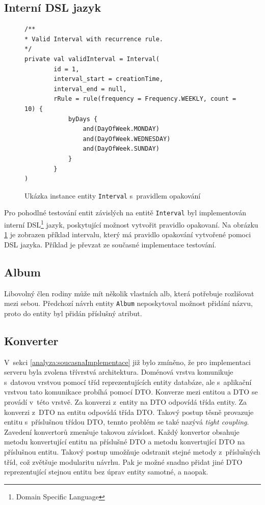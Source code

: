     \subsection{Interní DSL jazyk}\label{navrh:zmeny:dsl}
        \begin{figure} %
            \begin{verbatim}
/**
* Valid Interval with recurrence rule.
*/
private val validInterval = Interval(
        id = 1,
        interval_start = creationTime,
        interval_end = null,
        rRule = rule(frequency = Frequency.WEEKLY, count = 10) {
            byDays {
                and(DayOfWeek.MONDAY)
                and(DayOfWeek.WEDNESDAY)
                and(DayOfWeek.SUNDAY)
            }
        }
)
            \end{verbatim}
            \caption{Ukázka instance entity \texttt{Interval} s~pravidlem opakování} 
            \label{code:valid-interval}
        \end{figure}
        Pro pohodlné testování entit závislých na entitě \verb|Interval| byl implementován interní DSL\footnote{Domain Specific Language} jazyk, poskytující možnost vytvořit pravidlo opakovaní. Na obrázku \ref{code:valid-interval} je zobrazen příklad intervalu, který má pravidlo opakování vytvořené pomoci DSL jazyka. Příklad je převzat ze současné implementace testování.

    \subsection{Album}
        Libovolný člen rodiny může mít několik vlastních alb, která potřebuje rozlišovat mezi sebou. Předchozí návrh entity \verb|Album| neposkytoval možnost přidání názvu, proto do entity byl přidán příslušný atribut.
        
    \subsection{Konverter}
        V~sekci \ref{analyza:soucasnaImplementace} již bylo zmíněno, že pro implementaci serveru byla zvolena třívrstvá architektura. Doménová vrstva komunikuje s~datovou vrstvou pomocí tříd reprezentujících entity databáze, ale s~aplikační vrstvou tato komunikace probíhá pomocí DTO. Konverze mezi entitou a DTO se provádí v~této vrstvě. Za konverzi z~entity na DTO odpovídá třída entity. Za konverzi z~DTO na entitu odpovídá třída DTO.
        Takový postup těsně provazuje entitu s~příslušnou třídou DTO, tennto problém se také nazývá \textit{tight coupling}. Zavedení konvertorů zmenšuje takovou závislost. Každý konvertor obsahuje metodu konvertující entitu na příslušné DTO a metodu konvertující DTO na příslušnou entitu. Takový postup umožňuje odstranit stejné metody z~příslušných tříd, což zvětšuje modularitu návrhu. 
        Pak je možné snadno přidat jiné DTO reprezentující stejnou entitu bez úprav entity samotné, a naopak.
        
